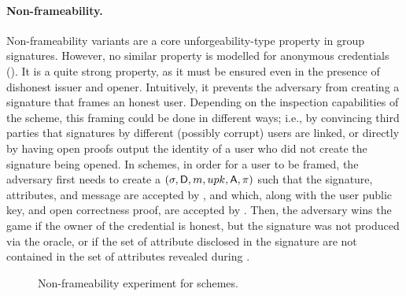 \paragraph{Non-frameability.} %
Non-frameability variants are a core unforgeability-type property in group
signatures. However, no
similar property is modelled for anonymous credentials (). It is a quite strong
property, as it must be ensured even in the presence of dishonest issuer and
opener. Intuitively, it prevents the adversary from creating a signature that
frames an honest user. Depending on the inspection capabilities of the scheme,
this framing could be done in different ways; i.e., by convincing third parties
that signatures by different (possibly corrupt) users are linked, or directly
by having open proofs output the identity of a user who did not create the
signature being opened.
%
In \GSAC schemes, in order for a user to be framed, the adversary first needs to
create a $(\sigma,\mathsf{D},m,upk,\mathsf{A},\pi)$ such that the signature,
attributes, and message are accepted by \Verify, and which, along with the user
public key, and open correctness proof, are accepted by \Judge.
Then, the adversary wins the game if the owner of the credential is honest, but
the signature was not produced via the \SIGN oracle, or if the set of attribute
disclosed in the signature are not contained in the set of attributes revealed
during \Open.

\begin{figure}[htp!]
  \caption{Non-frameability experiment for \GSAC schemes.}
  \label{fig:exp-gsac-frame}
\end{figure}

